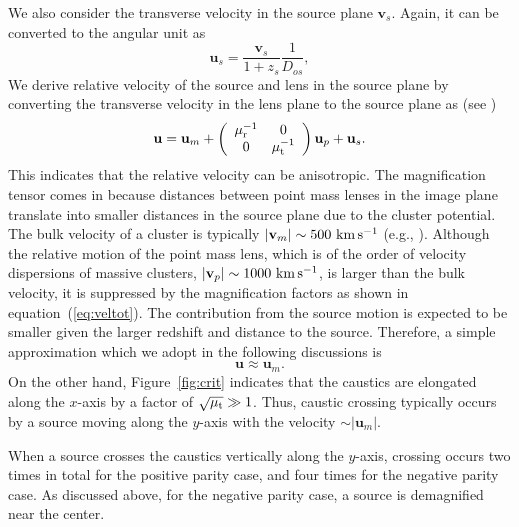 \documentclass[showpacs,twocolumn,preprintnumbers,amsmath,amssymb,superscriptaddress,nofootinbib]{revtex4}
\begin{document}
We also consider the transverse velocity in the source plane
$\mathbf{v}_s$. Again, it can be converted to the angular unit as
\begin{equation}
\mathbf{u}_s = \frac{\mathbf{v}_s}{1+z_s}\frac{1}{D_{os}},
\end{equation}
We derive relative velocity of the source and lens in the source plane
by converting the transverse velocity in the lens plane to the source
plane as (see \cite{Kayser:1986aa})
\begin{equation}
  \mathbf{u} =
  \mathbf{u}_m +\left(
    \begin{array}{cc}
     \mu_{\rm r}^{-1} & 0 \\
     0 & \mu_{\rm t}^{-1}
    \end{array}
    \right) \mathbf{u}_p +\mathbf{u}_s.
\label{eq:veltot}    
\end{equation}
This indicates that the relative velocity can be anisotropic. The
magnification tensor comes in because distances between point mass
lenses in the image plane translate into smaller distances in the
source plane due to the cluster potential.
The bulk velocity of a cluster is typically 
$|\mathbf{v}_m|\sim 500~{\rm km\,s^{-1}}$ (e.g.,
\cite{Dolag:2013hj}). Although the relative motion of the point mass
lens, which is of the order of velocity dispersions of massive
clusters, $|\mathbf{v}_p|\sim 1000~{\rm km\,s^{-1}}$, is larger than
the bulk velocity, it is suppressed by the magnification factors as
shown in equation~(\ref{eq:veltot}). 
The contribution from the source motion is expected to be smaller
given the larger redshift and distance to the source. Therefore,
a simple approximation which we adopt in the following discussions is
\begin{equation}
  \mathbf{u} \approx \mathbf{u}_m.
\end{equation}
On the other hand, Figure~\ref{fig:crit} indicates that the caustics
are elongated along the $x$-axis by a factor of $\sqrt{\mu_{\rm t}}\gg
1$. Thus, caustic crossing typically occurs by a source moving along
the $y$-axis with the velocity $\sim |\mathbf{u}_m|$.

When a source crosses the caustics vertically along the $y$-axis, crossing
occurs two times in total for the positive parity case, and four times
for the negative parity case. As discussed above, for the negative
parity case, a source is demagnified near the center.
\end{document}
